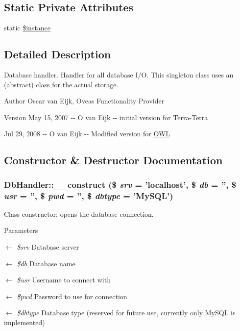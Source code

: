 \subsection*{Static Private Attributes}
\begin{DoxyCompactItemize}
\item 
static \hyperlink{classDbHandler_a0859a862eac3e8ba14c6d04de0396710}{\$instance}
\end{DoxyCompactItemize}


\subsection{Detailed Description}
Database handler. Handler for all database I/O. This singleton class uses an (abstract) class for the actual storage. \begin{DoxyAuthor}{Author}
Oscar van Eijk, Oveas Functionality Provider 
\end{DoxyAuthor}
\begin{DoxyVersion}{Version}
May 15, 2007 -\/-\/ O van Eijk -\/-\/ initial version for Terra-\/Terra 

Jul 29, 2008 -\/-\/ O van Eijk -\/-\/ Modified version for \hyperlink{classOWL}{OWL} 
\end{DoxyVersion}


\subsection{Constructor \& Destructor Documentation}
\subsubsection[{\_\-\_\-construct}]{\setlength{\rightskip}{0pt plus 5cm}DbHandler::\_\-\_\-construct (\$ {\em srv} = {\ttfamily 'localhost'}, \/  \$ {\em db} = {\ttfamily ''}, \/  \$ {\em usr} = {\ttfamily ''}, \/  \$ {\em pwd} = {\ttfamily ''}, \/  \$ {\em dbtype} = {\ttfamily 'MySQL'})}\label{classDbHandler_ae54e9d4643f41a9296167086f6a769fc}
Class constructor; opens the database connection.


\begin{DoxyParams}{Parameters}
\item[\mbox{$\leftarrow$} {\em \$srv}]Database server \item[\mbox{$\leftarrow$} {\em \$db}]Database name \item[\mbox{$\leftarrow$} {\em \$usr}]Username to connect with \item[\mbox{$\leftarrow$} {\em \$pwd}]Password to use for connection \item[\mbox{$\leftarrow$} {\em \$dbtype}]Database type (reserved for future use, currently only MySQL is implemented) \end{DoxyParams}


